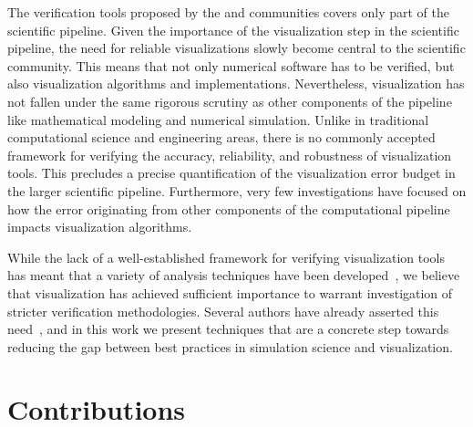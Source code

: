 The verification tools proposed by the \cs{} and \cse{} communities covers
only part of the scientific pipeline. Given the importance of the visualization step
in the scientific pipeline,  the need for reliable visualizations slowly become central to the scientific community. This means that not only numerical software has to be verified, but also visualization algorithms and implementations.
%
Nevertheless, visualization has not fallen under the same
rigorous scrutiny as other components of the pipeline
like mathematical modeling and numerical simulation.
Unlike in traditional computational science and engineering areas,
there is no commonly accepted framework for verifying the accuracy, reliability, 
and robustness of visualization tools. This precludes
a precise quantification of the visualization error budget in the 
larger scientific pipeline.
Furthermore, very few investigations have focused on how the error originating from 
other components of the computational pipeline
impacts visualization algorithms. 

While the lack of a well-established framework for verifying visualization
tools has meant that a variety of analysis techniques have been
developed~\cite{zhou01,tory04}, we believe that visualization 
has achieved sufficient importance to warrant investigation of
stricter verification methodologies. Several authors have
already asserted this need~\cite{Globus:1994:FWS:182452.182465, globus95,kirby-vv-08}, and in this work we present techniques that are a concrete step towards reducing the gap between best practices in simulation science and visualization.

\section{Contributions}

